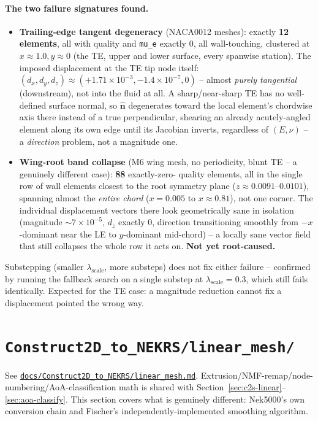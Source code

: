 \documentclass[11pt]{article}
\newcommand{\vecb}[1]{\bm{#1}}
\begin{document}
\paragraph{The two failure signatures found.}
\begin{itemize}
\item \textbf{Trailing-edge tangent degeneracy} (NACA0012 meshes):
  exactly \textbf{12 elements}, all with quality and \texttt{mu\_e}
  exactly \(0\), all wall-touching, clustered at \(x\approx1.0,
  y\approx0\) (the TE, upper and lower surface, every spanwise
  station). The imposed displacement at the TE tip node itself:
  \((d_x,d_y,d_z)\approx(+1.71\times10^{-3}, -1.4\times10^{-7}, 0)\) --
  almost \emph{purely tangential} (downstream), not into the fluid at
  all. A sharp/near-sharp TE has no well-defined surface normal, so
  \(\hat{\vecb{n}}\) degenerates toward the local element's chordwise
  axis there instead of a true perpendicular, shearing an already
  acutely-angled element along its own edge until its Jacobian
  inverts, regardless of \((E,\nu)\) -- a \emph{direction} problem, not
  a magnitude one.
\item \textbf{Wing-root band collapse} (M6 wing mesh, no periodicity,
  blunt TE -- a genuinely different case): \textbf{88} exactly-zero-
  quality elements, all in the single row of wall elements closest to
  the root symmetry plane (\(z\approx0.0091\)--\(0.0101\)), spanning
  almost the \emph{entire chord} (\(x=0.005\) to \(x\approx0.81\)), not
  one corner. The individual displacement vectors there look
  geometrically sane in isolation (magnitude \(\sim7\times10^{-5}\),
  \(d_z\) exactly \(0\), direction transitioning smoothly from
  \(-x\)-dominant near the LE to \(y\)-dominant mid-chord) -- a locally
  sane vector field that still collapses the whole row it acts on.
  \textbf{Not yet root-caused.}
\end{itemize}
Substepping (smaller \(\lambda_{\text{scale}}\), more substeps) does
not fix either failure -- confirmed by running the fallback search on a
single substep at \(\lambda_{\text{scale}}=0.3\), which still fails
identically. Expected for the TE case: a magnitude reduction cannot fix
a displacement pointed the wrong way.

\section{\texttt{Construct2D\_to\_NEKRS/linear\_mesh/}}
\label{sec:c2n-linear}
See \href{https://github.com/kvishalrai/AeroHexMesh/blob/master/docs/Construct2D_to_NEKRS/linear_mesh.md}{\texttt{docs/Construct2D\_to\_NEKRS/linear\_mesh.md}}.
Extrusion/NMF-remap/node-numbering/AoA-classification math is shared
with Section~\ref{sec:c2s-linear}--\ref{sec:aoa-classify}. This section
covers what is genuinely different: Nek5000's own conversion chain and
Fischer's independently-implemented smoothing algorithm.
\end{document}

